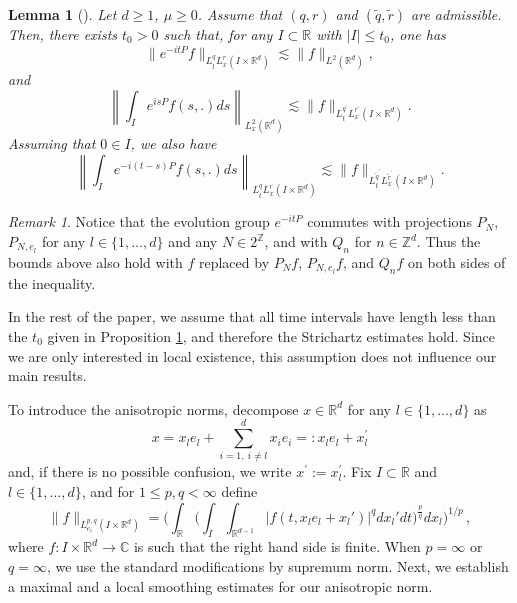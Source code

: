 \documentclass[aihp]{imsart}
\numberwithin{equation}{section}
\theoremstyle{plain}
\newtheorem{lem}[thm]{Lemma}
\theoremstyle{remark}
\newtheorem{rmq}[thm]{Remark}
\newcommand{\R}{\mathbb{R}}
\newcommand{\Z}{\mathbb{Z}}
\begin{document}
\begin{lem}[\cite{MR2787438,MR3852677,MR1151250,MR1646048}]
\label{strichartz}
Let $d\geq 1$, $\mu \geq 0$. Assume that $(q,r)$ and $(\tilde{q},\tilde{r})$ are admissible. Then, there exists $t_0>0$ such that, for any $I\subset \R$ with $|I|\leq t_0$, one has
\begin{equation}
\label{strichartze1}
\|e^{-it P} f\|_{L_t^q L_x^r (I\times \R^d)} \lesssim \|f\|_{L^2 (\R^d )},
\end{equation}
and
$$\left\|\int_I e^{is P  } f(s,.) ds\right\|_{L_x^2 (\R^d)}\lesssim \|f\|_{L_t^{q^\prime} L_x^{r^\prime} (I\times \R^d)}. $$
Assuming that $0\in I$, we also have
\begin{equation}
\label{strichartze3}
\left\|\int_I e^{-i(t-s)P  } f(s,.) ds \right\|_{L_t^q L_x^r (I\times \R^d)}\lesssim \|f\|_{L_t^{\tilde{q}^\prime} L_x^{\tilde{r}^\prime} (I\times \R^d)} . 
\end{equation}
\end{lem}
\begin{rmq}
Notice that the evolution group \(e^{-itP}\) commutes with projections \(P_{N}\), \(P_{N,e_{l}}\) for any \(l\in\{1,\ldots,d\}\) and any \(N\in2^{\Z}\), and with \(Q_{n}\) for \(n\in\Z^{d}\). Thus the bounds above also hold with \(f\) replaced by \(P_{N}f\), \(P_{N,e_{l}}f\), and \(Q_{n}f\) on both sides of the inequality.
\end{rmq}

In the rest of the paper, we assume that all time intervals have length less than the $t_0$ given in Proposition \ref{strichartz}, and therefore the Strichartz estimates hold. 
Since we are only interested in local existence, this assumption does not influence our main results.

 To introduce the anisotropic norms, decompose $x\in \R^d$  for any $l \in \{1, \dots, d\}$ as
$$
x=x_l e_l+\displaystyle\sum_{i=1,\ i\neq l}^d x_i e_i =: x_l e_l + x^\prime_l 
$$
and, if there is no possible confusion, we write $x^\prime := x_l^\prime$.  
Fix $I \subset \R$ and $l \in \{1, \dots, d\}$,  and for $1 \leq p,q<\infty$ define
$$\|f\|_{L_{e_l}^{p,q} (I\times \R^d )} = \Bigg(\int_{\R}  \Bigg(\int_I \int_{\R^{d-1}} |f(t,x_le_{l}+x_l')|^q dx_l' dt\Bigg)^{\frac{p}{q}} dx_l \Bigg)^{1/p} \,,$$
where $f : I \times \R^d \to \mathbb{C}$ is such that the right hand side is finite.
When $p=\infty$ or $q=\infty$, we use the standard modifications by supremum norm. 
Next, we establish a maximal and a local smoothing estimates for our anisotropic norm. 
\end{document}
